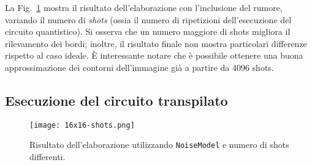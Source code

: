 La Fig.~\ref{fig:16x16-shots} mostra il risultato dell'elaborazione con
l'inclusione del rumore, variando il numero di \textit{shots} (ossia il numero
di ripetizioni dell'esecuzione del circuito quantistico). Si osserva che un
numero maggiore di shots migliora il rilevamento dei bordi; inoltre, il
risultato finale non mostra particolari differenze rispetto al caso ideale. È
interessante notare che è possibile ottenere una buona approssimazione dei
contorni dell'immagine già a partire da 4096 shots.

\subsection{Esecuzione del circuito transpilato}

\begin{figure}
	\begin{center}
		\texttt{[image: 16x16-shots.png]}
	\end{center}
	\caption{Risultato dell'elaborazione utilizzando \texttt{NoiseModel} e numero di shots differenti.}\label{fig:16x16-shots}
\end{figure}
